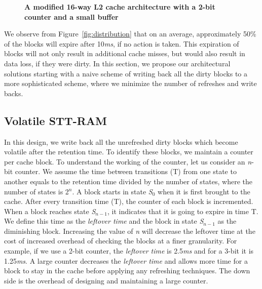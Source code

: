 
\begin{figure*} [t]
\center
 \caption{\label{fig:architecture} \scriptsize \bf A modified 16-way L2 cache architecture with a 2-bit counter and a small buffer}
\end{figure*}


We observe from Figure~\ref{fig:distribution} that on an average, approximately 50\% of the blocks will
expire after 10{\it ms}, if no action is taken. This expiration of blocks will not only result in additional cache misses,
but would also
result in data loss, if they were dirty. In this section, we propose our architectural solutions starting with
a naive scheme of writing back
all the dirty blocks to a more sophisticated scheme, where we minimize the number of refreshes and write backs.

\subsection{{Volatile STT-RAM}}
In this design, we write back all the unrefreshed dirty blocks which become volatile after the retention time.
To identify these blocks,
we maintain a counter per cache block.  To understand the working of the counter, let us consider an {\it n}-bit
counter. We assume the time between transitions (T) from one state to another equals to the retention time
divided by the number of states, where the number of states is 2$^n$.
A block starts in state {\it S$_0$} when it is first brought to the cache. After every transition time (T),
the counter of each block is incremented.
When a block reaches  state {\it S$_{n-1}$}, it indicates that it is going to expire in time T.
We define this time as the {\it leftover time} and the block in state {\it S$_{n-1}$} as  the diminishing block.
Increasing the value of {\it n} will decrease the leftover time at the cost of increased overhead of checking
the blocks at a finer granularity.
For example, if we use a 2-bit counter, the {\it leftover time} is 2.5{\it ms} and for a 3-bit it is 1.25{\it ms}.
A large counter decreases the {\it leftover time} and allows more time for a block to stay in the cache
before applying any refreshing techniques. The down side is the overhead of designing and maintaining a large counter.

